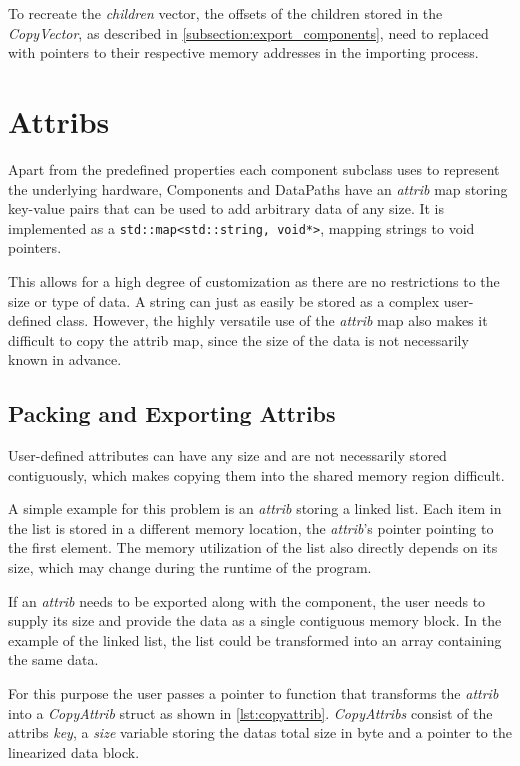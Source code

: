 To recreate the \emph{children} vector, the offsets of the children stored in the \emph{CopyVector}, as described in \autoref{subsection:export_components},
need to replaced with pointers to their respective memory addresses in the importing process.

\section{Attribs}\label{section:attribs}
Apart from the predefined properties each component subclass uses to represent the underlying hardware, Components and DataPaths have an \emph{attrib} map storing key-value pairs that can be used to add arbitrary data of any size.
It is implemented as a \lstinline{std::map<std::string, void*>}, mapping strings to void pointers.

This allows for a high degree of customization as there are no restrictions to the size or type of data. A string can just as easily be stored as a complex user-defined class.
However, the highly versatile use of the \emph{attrib} map also makes it difficult to copy the attrib map, since the size of the data is not necessarily known in advance.

\subsection{Packing and Exporting Attribs}\label{subsection:packing_and_exporting}
User-defined attributes can have any size and are not necessarily stored contiguously, which makes copying them into the shared memory region difficult.

A simple example for this problem is an \emph{attrib} storing a linked list. Each item in the list is stored in a different memory location,
the \emph{attrib}'s pointer pointing to the first element. The memory utilization of the list also directly depends on its size, which may change during the runtime of the program.

If an \emph{attrib} needs to be exported along with the component, the user needs to supply its size and provide the data as a single contiguous memory block.
In the example of the linked list, the list could be transformed into an array containing the same data.

For this purpose the user passes a pointer to function that transforms the \emph{attrib} into a \emph{CopyAttrib} struct as shown in \autoref{lst:copyattrib}.
\emph{CopyAttribs} consist of the attribs \emph{key}, a \emph{size} variable storing the datas total size in byte and a pointer to the linearized data block.

